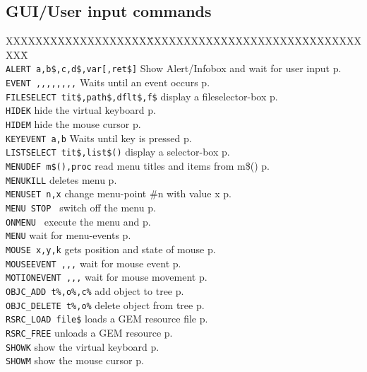 \subsection{GUI/User input commands}
\begin{tabbing}
XXXXXXXXXXXXXXXXXXX\=XXXXXXXXXXXXXXXXXXXXXXXXXXXXXXXX\=\kill\\
\verb|ALERT a,b$,c,d$,var[,ret$]| \> Show Alert/Infobox and wait for user input\> p.\pageref{ALERT}\\
\verb|EVENT ,,,,,,,,|	 \> Waits until an event occurs\> p.\pageref{EVENT}\\
\verb|FILESELECT tit$,path$,dflt$,f$|  \> display a fileselector-box\> p.\pageref{FILESELECT}\\
\verb|HIDEK|  	         \> hide the virtual keyboard\> p.\pageref{HIDEK}\\
\verb|HIDEM|  	         \> hide the mouse cursor\> p.\pageref{HIDEM}\\
\verb|KEYEVENT a,b|	 \> Waits until key is pressed\> p.\pageref{KEYEVENT}\\
\verb|LISTSELECT tit$,list$()|  \> display a selector-box\> p.\pageref{LISTSELECT}\\

\verb|MENUDEF m$(),proc| \> read menu titles and items from m\$()\> p.\pageref{MENUDEF}\\
\verb|MENUKILL|		 \> deletes menu\> p.\pageref{MENUKILL}\\
\verb|MENUSET n,x|	 \> change menu-point \#n with value x\> p.\pageref{MENUSET}\\
\verb|MENU STOP	|	 \> switch off the menu\> p.\pageref{MENUbSTOP}\\
\verb|ONMENU | 		 \> execute the menu and\> p.\pageref{ONMENU}\\
\verb|MENU|		 \> wait for menu-events\> p.\pageref{MENU}\\
\verb|MOUSE x,y,k|	 \> gets position and state of mouse\> p.\pageref{MOUSE}\\
\verb|MOUSEEVENT ,,,|	 \> wait for mouse event\> p.\pageref{MOUSEEVENT}\\
\verb|MOTIONEVENT ,,,|	 \> wait for mouse movement\> p.\pageref{MOTIONEVENT}\\
\verb|OBJC_ADD t%,o%,c%| \> add object to tree\> p.\pageref{OBJCiADD}\\
\verb|OBJC_DELETE t%,o%| \> delete object from tree\> p.\pageref{OBJCiDELETE}\\
\verb|RSRC_LOAD file$|   \> loads a GEM resource file\> p.\pageref{RSRCiLOAD}\\
\verb|RSRC_FREE|         \> unloads a GEM resource \> p.\pageref{RSRCiFREE}\\
\verb|SHOWK|  	         \> show the virtual keyboard\> p.\pageref{SHOWK}\\
\verb|SHOWM|  	         \> show the mouse cursor\> p.\pageref{SHOWM}\\
\end{tabbing}


